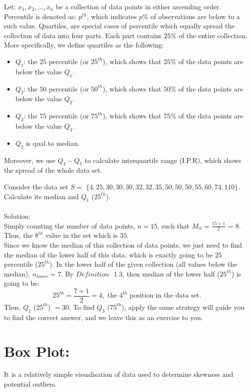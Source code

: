\begin{definition}
Let: $x_1, x_2, ..., x_n$ be a collection of data points in either ascending order. Percentile is denoted as: $p^{th}$, which indicates $p \%$ of observations are below to a such value. Quartiles, are special cases of percentile which equally spread the collection of data into four parts. Each part contains $25\%$ of the entire collection. More specifically, we define quartiles as the following:
\begin{itemize}
	\item $Q_1$: the $25$ percentile (or $25^{th}$), which shows that $25\%$ of the data points are below the value $Q_1$.
	\item $Q_2$: the $50$ percentile (or $50^{th}$), which shows that $50\%$ of the data points are below the value $Q_2$.
	\item $Q_3$: the $75$ percentile (or $75^{th}$), which shows that $75\%$ of the data points are below the value $Q_3$.
	\item $Q_2$ is qual to median.
\end{itemize}
Moreover, we use $Q_3 - Q_1$ to calculate interquartile range (I.P.R), which shows the spread of the whole data set.
\end{definition}
	
\begin{example}
Consider the data set $S = $ $\{4, 25, 30, 30, 30, 32, 32, 35, 50, 50, 50, 55, 60, 74, 110\}$. Calculate its median and $Q_1$ ($25^{th}$).\\

\\

Solution:\\

Simply counting the number of data points, $n = 15$, such that $M_{S}$ = $\frac{15 + 1}{2}$ = $8$. Thus, the $8^{th}$ value in the set which is $35$.\\

Since we know the median of this collection of data points, we just need to find the median of the lower half of this data, which is exactly going to be $25$ percentile ($25^{th}$). In the lower half of the given collection (all values below the median), $n_{lower} = 7$. By $Definition \text{ } 1.3$, then median of the lower half ($25^{th}$) is going to be: \[ 25^{th} = \frac{7+1}{2} = 4, \text{ the $4^{th}$ position in the data set}.\] Thus, $Q_1$ ($25^{th}$) $= 30$. To find $Q_3$ ($75^{th}$), apply the same strategy will guide you to find the correct answer, and we leave this as an exercise to you.

\end{example}
	
\section{Box Plot:}

It is a relatively simple visualisation of data used to determine skewness and potential outliers. 
	
	
	
	
	
	





